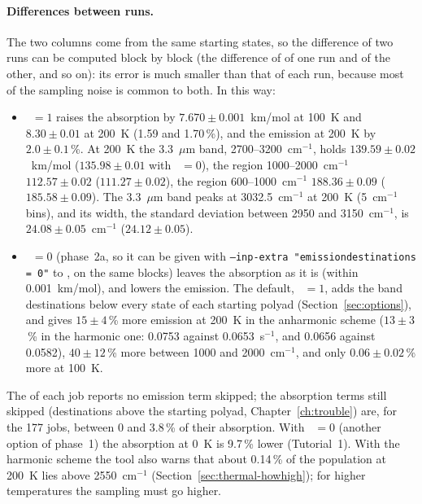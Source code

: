 \paragraph{Differences between runs.} The two columns come from the same
starting states, so the difference of two runs can be computed block by
block (the difference of  of one run and of the other, and
so on): its error is much smaller than that of each run, because most of
the sampling noise is common to both. In this way:
\begin{itemize}
\item {}~$=1$ raises the absorption by $7.670\pm0.001$~km/mol at
100~K and $8.30\pm0.01$ at 200~K (1.59 and 1.70\,\%), and the emission
at 200~K by $2.0\pm0.1$\,\%. At 200~K the 3.3~$\mu$m band,
2700--3200~cm$^{-1}$, holds $139.59\pm0.02$~km/mol ($135.98\pm0.01$ with
~$=0$), the region 1000--2000~cm$^{-1}$ $112.57\pm0.02$
($111.27\pm0.02$), the region 600--1000~cm$^{-1}$ $188.36\pm0.09$
($185.58\pm0.09$). The 3.3~$\mu$m band peaks at 3032.5~cm$^{-1}$ at 200~K
(5~cm$^{-1}$ bins), and its width, the standard deviation between 2950
and 3150~cm$^{-1}$, is $24.08\pm0.05$~cm$^{-1}$ ($24.12\pm0.05$).
\item {}~$=0$ (phase~2a, so it can be given with
\texttt{--inp-extra "emissiondestinations = 0"} to ,
on the same blocks) leaves the absorption as it is (within
0.001~km/mol), and lowers the emission. The default,
~$=1$, adds the band destinations below every
state of each starting polyad (Section~\ref{sec:options}), and gives
$15\pm4$\,\% more emission at 200~K in the anharmonic scheme ($13\pm3$\,\%
in the harmonic one: 0.0753 against 0.0653~s$^{-1}$, and 0.0656 against
0.0582), $40\pm12$\,\% more between 1000 and 2000~cm$^{-1}$, and only
$0.06\pm0.02$\,\% more at 100~K.
\end{itemize}
The  of each job reports no emission term skipped; the
absorption terms still skipped (destinations above the starting polyad,
Chapter~\ref{ch:trouble}) are, for the 177 jobs, between 0 and 3.8\,\%
of their absorption. With ~$=0$ (another option of
phase~1) the absorption at 0~K is 9.7\,\% lower (Tutorial~1).
With the harmonic scheme the tool also warns that
about 0.14\,\% of the population at 200~K lies above 2550~cm$^{-1}$
(Section~\ref{sec:thermal-howhigh}); for higher temperatures the
sampling must go higher.

